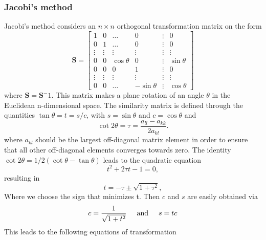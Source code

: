 \documentclass[%
reprint,
amsmath,amssymb,
aps,
]{revtex4-1}
\begin{document}
\subsubsection*{Jacobi's method}  \noindent 
Jacobi's method considers an $n\times n$ orthogonal transformation matrix on the form 
\begin{equation*}
\mathbf{S} = \begin{bmatrix}
1 & 0  & \dots & 0 &\vdots &0 \\
0 & 1  & \dots & 0 & \vdots & 0 \\
\vdots & \vdots &\vdots&\vdots&\vdots&\vdots\\
0 & 0 & \cos{\theta} & 0 &\vdots & \sin{\theta} \\
0  & 0 & 0 & 1 &\vdots & 0 \\
 \vdots & \vdots &\vdots&\vdots&\vdots&\vdots\\
 0 & 0 &\dots & -\sin{\theta} & \vdots & \cos{\theta}
\end{bmatrix}
\end{equation*}
where $\mathbf{S} = \mathbf{S}^-1$. This matrix makes a plane rotation of an angle $\theta$ in the Euclidean n-dimensional space. The similarity matrix is defined through the quantities $\tan\theta = t= s/c$, with $s=\sin\theta$ and $c=\cos\theta$ and
\begin{equation*}\cot 2\theta=\tau = \frac{a_{ll}-a_{kk}}{2a_{kl}}.
\end{equation*}
where $a_{kl}$ should be the largest off-diagonal matrix element in order to ensure that all other off-diagonal elements converges towards zero. The identity $\cot 2\theta=1/2(\cot \theta-\tan\theta)$ leads to the quadratic equation
\begin{equation*}
t^2+2\tau t-1= 0,
\end{equation*}
resulting in
\begin{equation*}
t = -\tau \pm \sqrt{1+\tau^2},
\end{equation*}
Where we choose the sign that minimizes t. Then $c$ and $s$ are easily obtained via
\begin{equation}\label{sc}
c = \frac{1}{\sqrt{1+t^2}} \hspace{5mm}  \textnormal{and} \hspace{5mm} s=tc
\end{equation}  
\noindent
This leads to the following equations of transformation
\end{document}
